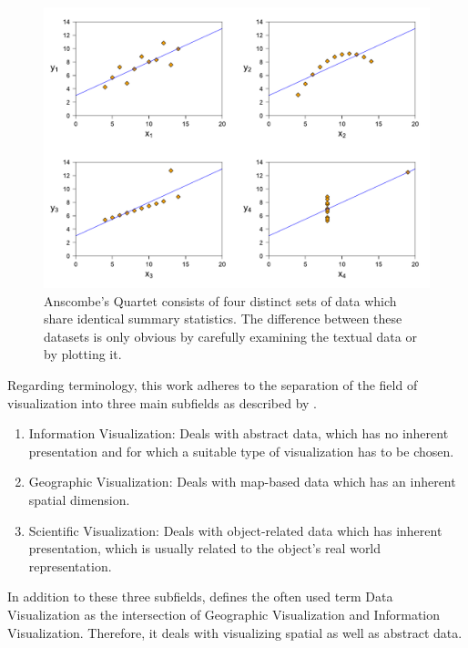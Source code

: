\begin{figure}[tp]
    \centering
    \includegraphics[keepaspectratio,width=\linewidth,height=\fullh / 3]
    {diagrams/anscombe.pdf}

    \caption[Anscombe's Quartet]{
        Anscombe's Quartet consists of four distinct sets of data which share identical summary statistics. The difference between these datasets is only obvious by carefully examining the textual data or by plotting it. 
    }
    \label{fig:AnscombesQuartet}
\end{figure}

Regarding terminology, this work adheres to the separation of the field of visualization into three main subfields as described by \cite{IVISCourseNotes}.

\begin{enumerate}
    \item Information Visualization: Deals with abstract data, which has no inherent presentation and for which a suitable type of visualization has to be chosen.
    \item Geographic Visualization: Deals with map-based data which has an inherent spatial dimension. 
    \item Scientific Visualization: Deals with object-related data which has inherent presentation, which is usually related to the object's real world representation.
\end{enumerate}

In addition to these three subfields, \cite{IVISCourseNotes} defines the often used term Data Visualization as the intersection of Geographic Visualization and Information Visualization. Therefore, it deals with visualizing spatial as well as abstract data.

